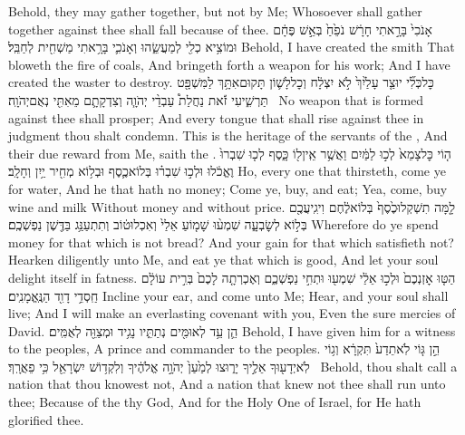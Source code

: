 {Behold, they may gather together, but not by Me; Whosoever shall gather together against thee shall fall because of thee.}
{ אָנֹכִי֙ בָּרָ֣אתִי חָרָ֔שׁ נֹפֵ֙חַ֙ בְּאֵ֣שׁ פֶּחָ֔ם וּמוֹצִ֥יא כְלִ֖י לְמַעֲשֵׂ֑הוּ וְאָנֹכִ֛י בָּרָ֥אתִי מַשְׁחִ֖ית לְחַבֵּֽל׃}
{Behold, I have created the smith That bloweth the fire of coals, And bringeth forth a weapon for his work; And I have created the waster to destroy.}
{כׇּל\maqqaf כְּלִ֞י יוּצַ֤ר עָלַ֙יִךְ֙ לֹ֣א יִצְלָ֔ח וְכׇל\maqqaf לָשׁ֛וֹן תָּקוּם\maqqaf אִתָּ֥ךְ לַמִּשְׁפָּ֖ט תַּרְשִׁ֑יעִי זֹ֡את נַחֲלַת֩ עַבְדֵ֨י יְהֹוָ֧ה וְצִדְקָתָ֛ם מֵאִתִּ֖י נְאֻם\maqqaf יְהֹוָֽה׃ \setuma }
{No weapon that is formed against thee shall prosper; And every tongue that shall rise against thee in judgment thou shalt condemn. This is the heritage of the servants of the \lord, And their due reward from Me, saith the \lord.}
\newperek
{}
{ה֤וֹי כׇּל\maqqaf צָמֵא֙ לְכ֣וּ לַמַּ֔יִם וַאֲשֶׁ֥ר אֵֽין\maqqaf ל֖וֹ כָּ֑סֶף לְכ֤וּ שִׁבְרוּ֙ וֶאֱכֹ֔לוּ וּלְכ֣וּ שִׁבְר֗וּ בְּלוֹא\maqqaf כֶ֛סֶף וּבְל֥וֹא מְחִ֖יר יַ֥יִן וְחָלָֽב׃}
{Ho, every one that thirsteth, come ye for water, And he that hath no money; Come ye, buy, and eat; Yea, come, buy wine and milk Without money and without price.}
{לָ֤מָּה תִשְׁקְלוּ\maqqaf כֶ֙סֶף֙ בְּלוֹא\maqqaf לֶ֔חֶם וִיגִֽיעֲכֶ֖ם בְּל֣וֹא לְשׇׂבְעָ֑ה שִׁמְע֨וּ שָׁמ֤וֹעַ אֵלַי֙ וְאִכְלוּ\maqqaf ט֔וֹב וְתִתְעַנַּ֥ג בַּדֶּ֖שֶׁן נַפְשְׁכֶֽם׃}
{Wherefore do ye spend money for that which is not bread? And your gain for that which satisfieth not? Hearken diligently unto Me, and eat ye that which is good, And let your soul delight itself in fatness.}
{הַטּ֤וּ אׇזְנְכֶם֙ וּלְכ֣וּ אֵלַ֔י שִׁמְע֖וּ וּתְחִ֣י נַפְשְׁכֶ֑ם וְאֶכְרְתָ֤ה לָכֶם֙ בְּרִ֣ית עוֹלָ֔ם חַֽסְדֵ֥י דָוִ֖ד הַנֶּֽאֱמָנִֽים׃}
{Incline your ear, and come unto Me; Hear, and your soul shall live; And I will make an everlasting covenant with you, Even the sure mercies of David.}
{הֵ֛ן עֵ֥ד לְאוּמִּ֖ים נְתַתִּ֑יו נָגִ֥יד וּמְצַוֵּ֖ה לְאֻמִּֽים׃}
{Behold, I have given him for a witness to the peoples, A prince and commander to the peoples.}
{הֵ֣ן גּ֤וֹי לֹֽא\maqqaf תֵדַע֙ תִּקְרָ֔א וְג֥וֹי לֹֽא\maqqaf יְדָע֖וּךָ אֵלֶ֣יךָ יָר֑וּצוּ לְמַ֙עַן֙ יְהֹוָ֣ה אֱלֹהֶ֔יךָ וְלִקְד֥וֹשׁ יִשְׂרָאֵ֖ל כִּ֥י פֵאֲרָֽךְ׃ \setuma }
{Behold, thou shalt call a nation that thou knowest not, And a nation that knew not thee shall run unto thee; Because of the \lord\space thy God, And for the Holy One of Israel, for He hath glorified thee.}
